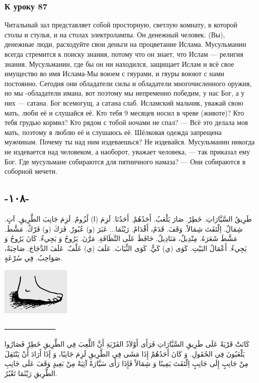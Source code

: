\documentclass[a5paper]{article}
\begin{document}
\subsubsection{К уроку 87}
Читальный зал представляет собой просторную, светлую комнату, в которой столы и стулья, и на столах электролампы. Он денежный человек. (Вы), денежные люди, расходуйте свои деньги на процветание Ислама. Мусульманин всегда стремится к поиску знания, потому что он знает, что Ислам — религия знания. Мусульманин, где бы он ни находился, защищает Ислам и всё свое имущество во имя Ислама-Мы воюем с гяурами, и гяуры воюют с нами постоянно. Сегодня они обладатели силы и обладатели многочисленного оружия, но мы -обладатели имана, вот поэтому мы непременно победим, у нас Бог, а у них — сатана. Бог всемогущ, а сатана слаб. Исламский мальчик, уважай свою мать, люби её и слушайся её. Кто тебя 9 месяцев носил в чреве (животе)? Кто тебя грудью кормил? Кто рядом с тобой ночами не спал? — Всё это делала моя мать, поэтому я люблю её и слушаюсь её. Шёлковая одежда запрещена мужчинам. Почему ты над ним издеваешься? Не издевайся. Мусульманин никогда не издевается над человеком, а наоборот, уважает человека, — так приказал ему Бог. Где мусульмане собираются для пятничного намаза? — Они собираются в соборной мечети.

\subsection{-١٠٨-}
طَرِيقُ السَّيَّارَاتِ. خَطِرٌ. صَارَ يَلْعَبُ. أَحَدُهُمْ. أَحَدُنَا. لَزِمَ (ا) لُزُومٌ. لَزِمَ جَانِبَ الطَّرِيقِ. آتٍ. شِمَالٌ. اِلْتَفَتَ شِمَالاً. وَقَفَ. قَدَمٌ، أَقْدَامٌ. رَيْثَمَا... عَبَرَ (و) عُبُورٌ. فَرَكَ (و) فَرْكٌ. مَشَّطَ. مَشَّطَ شَعَرَهُ. مِنْدِيلٌ، مَنَادِيلُ. حَافَظَ عَلَى النَّظَافَةِ. مَرَّنَ. يَرُوحُ وَ يَجِيءُ. كَانَ يَرُوحُ وَ يَجِيءُ. أَعْمَالُ البَيْتِ. كَوَى (ي) كَيٌّ. كَوَى الثِّيَابَ. عَلَفَ (ي) عَلْفٌ. عَلَفَ الدَّجَاجَ. صَاحِبَةٌ، صَوَاحِبُ. فِي سُرْعَةٍ.

\begin{center}
\includegraphics[width=1.311in,height=0.9055in]{MuhammadBagauddinlatinized-img281.png}
\end{center}
ـــــــــــــــــــــــــ

كَانَتْ قَرْيَةٌ عَلَى طَرِيقِ السَّيَّارَاتِ فَرَأَى أَوْلاَدُ القَرْيَةِ أَنَّ اللَّعِبَ فِي الطَّرِيقِ خَطِرٌ فَصَارُوا يَلْعَبُونَ فِي الحُقَولِ. وَ كَانَ أَحَدُهُمْ إِذَا مَشَى فِي الطَّرِيقِ لَزِمَ جَانِبًا، وَ إَذَا أَرَادَ أَنْ يَنْتَقِلَ مِنْ جَانِبٍ إِلَى جَانِبٍ اِلْتَفَتَ يَمِينًا وَ شِمَالاً فَإِذَا رَأَى سَيَّارَةً آتِيَةً مِنْ بَعِيدٍ وَقَفَ عَلَى جَانِبِ الطَّرِيقِ رَيْثَمَا تَعْبُرُ. 
\end{document}
